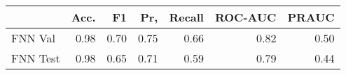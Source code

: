 \begin{tabular}{lrrrrrr}
\toprule
{} &  Acc. &    F1 &   Pr, &  Recall &  ROC-AUC &  PRAUC \\
\midrule
FNN Val  &  0.98 &  0.70 &  0.75 &    0.66 &     0.82 &   0.50 \\
FNN Test &  0.98 &  0.65 &  0.71 &    0.59 &     0.79 &   0.44 \\
\bottomrule
\end{tabular}
